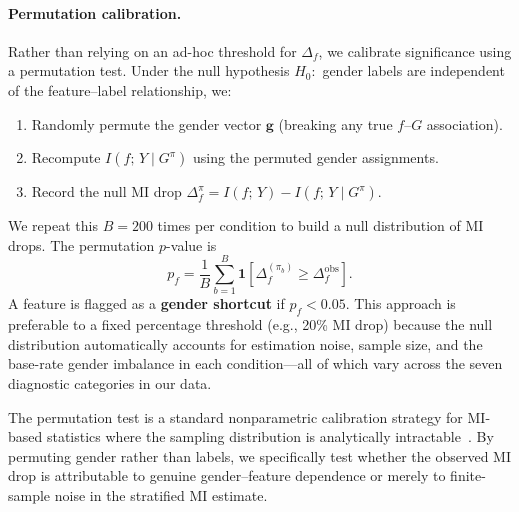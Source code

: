 \documentclass[11pt]{article}
\begin{document}
\paragraph{Permutation calibration.}
Rather than relying on an ad-hoc threshold for $\Delta_f$, we calibrate significance using a permutation test. Under the null hypothesis $H_0{:}$ gender labels are independent of the feature--label relationship, we:
\begin{enumerate}
    \item Randomly permute the gender vector $\mathbf{g}$ (breaking any true $f$--$G$ association).
    \item Recompute $I(f;\, Y \mid G^{\pi})$ using the permuted gender assignments.
    \item Record the null MI drop $\Delta_f^{\pi} = I(f;\, Y) - I(f;\, Y \mid G^{\pi})$.
\end{enumerate}
We repeat this $B{=}200$ times per condition to build a null distribution of MI drops. The permutation $p$-value is
\begin{equation}
    p_f = \frac{1}{B} \sum_{b=1}^{B} \mathbf{1}\!\left[\Delta_f^{(\pi_b)} \geq \Delta_f^{\text{obs}}\right].
\end{equation}
A feature is flagged as a \textbf{gender shortcut} if $p_f < 0.05$. This approach is preferable to a fixed percentage threshold (e.g., 20\% MI drop) because the null distribution automatically accounts for estimation noise, sample size, and the base-rate gender imbalance in each condition---all of which vary across the seven diagnostic categories in our data.

The permutation test is a standard nonparametric calibration strategy for MI-based statistics where the sampling distribution is analytically intractable~\citep{roulston1999estimating,steuer2002mutual}. By permuting gender rather than labels, we specifically test whether the observed MI drop is attributable to genuine gender--feature dependence or merely to finite-sample noise in the stratified MI estimate.
\end{document}
